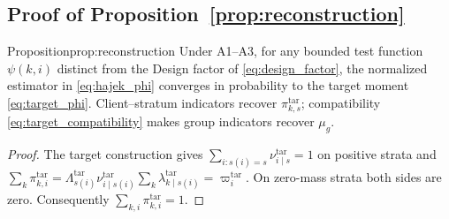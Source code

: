 \subsection{Proof of Proposition~\ref{prop:reconstruction}}
\begin{restated}{Proposition}{prop:reconstruction}
Under A1--A3, for any bounded test function $\psi(k,i)$ distinct from the
Design factor of \eqref{eq:design_factor},
the normalized estimator in \eqref{eq:hajek_phi} converges in probability
to the target moment \eqref{eq:target_phi}.
Client--stratum indicators recover $\pi^{\mathrm{tar}}_{k,s}$; compatibility
\eqref{eq:target_compatibility} makes group indicators recover $\mu_g$.
\end{restated}
\begin{proof}

The target construction gives $\sum_{i:s(i)=s}\nu^{\mathrm{tar}}_{i\mid s}=1$
on positive strata and
$\sum_k\pi^{\mathrm{tar}}_{k,i}=\Lambda^{\mathrm{tar}}_{s(i)}
\nu^{\mathrm{tar}}_{i\mid s(i)}\sum_k\lambda^{\mathrm{tar}}_{k\mid s(i)}
=\varpi_i^{\mathrm{tar}}$.  On zero-mass strata both sides are zero.
Consequently $\sum_{k,i}\pi^{\mathrm{tar}}_{k,i}=1$.


\end{proof}
